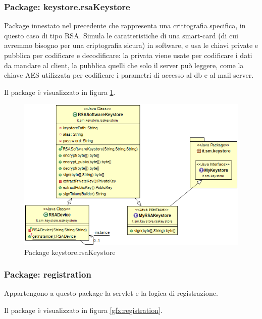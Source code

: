 \subsubsection{Package: \textbf{keystore.rsaKeystore}}

Package innestato nel precedente che rappresenta una crittografia specifica, in questo caso di tipo RSA. Simula le caratteristiche di una smart-card (di cui avremmo bisogno per una criptografia sicura) in software, e usa le chiavi private e pubblica per codificare e decodificare: la privata viene usate per codificare i dati da mandare al client, la pubblica quelli che solo il server può leggere, come la chiave AES utilizzata per codificare i parametri di accesso al db e al mail server.


Il package è visualizzato in figura \ref{gfx:keystore.rsaKeystore}.

\begin{figure}[!htbp]
	\centering
	\includegraphics[scale = .5]{img/dependencies_rsakeystore.png}
	\caption{Package keystore.rsaKeystore}
	\label{gfx:keystore.rsaKeystore}
\end{figure}

\subsubsection{Package: \textbf{registration}}

Appartengono a questo package la servlet e la logica di registrazione.


Il package è visualizzato in figura \ref{gfx:registration}.

